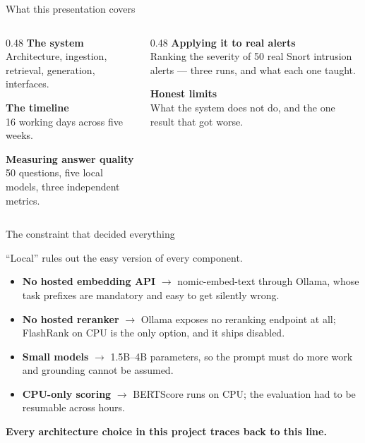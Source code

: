 \documentclass[aspectratio=169,11pt]{beamer}
\newcommand{\code}[1]{{\small\ttfamily #1}}
\newcommand{\lede}[1]{{\color{soft}\small #1\par\medskip}}
\newcommand{\keytake}[1]{%
  \vfill
  \noindent\colorbox{accenttint}{%
    \begin{minipage}{\dimexpr\textwidth-2\fboxsep-2\fboxrule\relax}
      \vspace{2pt}
      \small\color{accent}\textbf{#1}
      \vspace{2pt}
    \end{minipage}}\par}
\begin{document}
\begin{frame}{What this presentation covers}
  \begin{columns}[T,onlytextwidth]
    \begin{column}{0.48\textwidth}
      \textbf{\color{accent}The system}\\[0.3em]
      {\small Architecture, ingestion, retrieval, generation, interfaces.}
      \vspace{1.1em}

      \textbf{\color{accent}The timeline}\\[0.3em]
      {\small 16 working days across five weeks.}
      \vspace{1.1em}

      \textbf{\color{accent}Measuring answer quality}\\[0.3em]
      {\small 50 questions, five local models, three independent metrics.}
    \end{column}
    \begin{column}{0.48\textwidth}
      \textbf{\color{accent}Applying it to real alerts}\\[0.3em]
      {\small Ranking the severity of 50 real Snort intrusion alerts --- three runs, and what each one taught.}
      \vspace{1.1em}

      \textbf{\color{accent}Honest limits}\\[0.3em]
      {\small What the system does not do, and the one result that got worse.}
    \end{column}
  \end{columns}
\end{frame}

\begin{frame}{The constraint that decided everything}
  \lede{``Local'' rules out the easy version of every component.}
  \begin{itemize}
    \item \textbf{No hosted embedding API} $\rightarrow$ \code{nomic-embed-text} through Ollama, whose task prefixes are mandatory and easy to get silently wrong.
    \item \textbf{No hosted reranker} $\rightarrow$ Ollama exposes no reranking endpoint at all; FlashRank on CPU is the only option, and it ships disabled.
    \item \textbf{Small models} $\rightarrow$ 1.5B--4B parameters, so the prompt must do more work and grounding cannot be assumed.
    \item \textbf{CPU-only scoring} $\rightarrow$ BERTScore runs on CPU; the evaluation had to be resumable across hours.
  \end{itemize}
  \keytake{Every architecture choice in this project traces back to this line.}
\end{frame}
\end{document}
